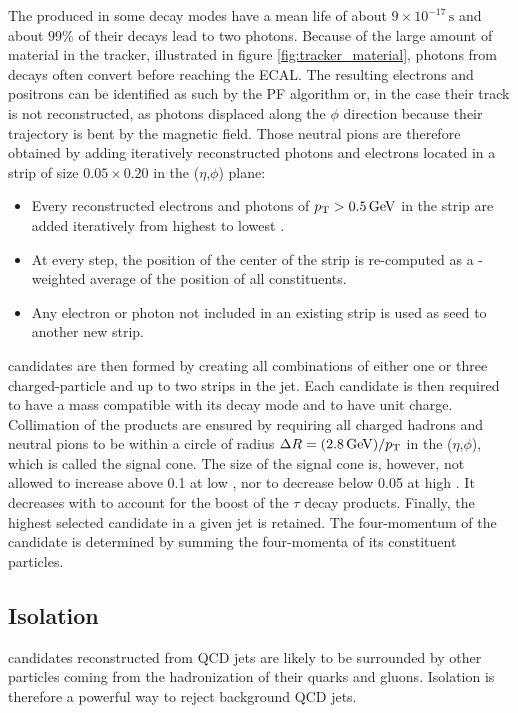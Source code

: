 The \pizero produced in some decay modes have a mean life of about $9 \times 10^{-17}\,\mathrm{s}$ and about $99\%$ of their decays lead to two photons. Because of the large amount of material in the tracker, illustrated in figure \ref{fig:tracker_material}, photons from \pizero decays often convert before reaching the ECAL. The resulting electrons and positrons can be identified as such by the PF algorithm or, in the case their track is not reconstructed, as photons displaced along the $\phi$ direction because their trajectory is bent by the magnetic field.
Those neutral pions are therefore obtained by adding iteratively reconstructed photons and electrons located in a strip of size $0.05 \times 0.20$ in the ($\eta$,$\phi$) plane:
\begin{itemize}
    \item Every reconstructed electrons and photons of $p_{\mathrm{T}} > 0.5\,\mathrm{GeV}$ in the strip are added iteratively from highest to lowest \pt.
    \item At every step, the position of the center of the strip is re-computed as a \pt-weighted average of the position of all constituents.
    \item Any electron or photon not included in an existing strip is used as seed to another new strip.
\end{itemize}

\tauh candidates are then formed by creating all combinations of either one or three charged-particle and up to two strips in the jet.
Each \tauh candidate is then required to have a mass compatible with its decay mode and to have unit charge.
Collimation of the products are ensured by requiring all charged hadrons and neutral pions to be within a circle of radius $\Delta R = (2.8\,\mathrm{GeV})/p_{\mathrm{T}}$ in the ($\eta$,$\phi$), which is called the signal cone.
The size of the signal cone is, however, not allowed to increase above 0.1 at low \pt, nor to decrease below 0.05 at high \pt. It decreases with \pt to account for the boost of the $\tau$ decay products. Finally, the highest \pt selected \tauh candidate in a given jet is retained. The four-momentum of the \tauh candidate is determined by summing the four-momenta of its constituent particles.

\subsection{Isolation}


\tauh candidates reconstructed from QCD jets are likely to be surrounded by other particles coming from the hadronization of their quarks and gluons.
Isolation is therefore a powerful way to reject background QCD jets.

